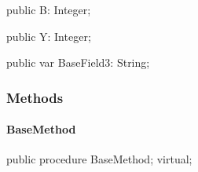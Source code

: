 \documentclass{report}
\newif\ifpdf
\begin{document}
\begin{list}{}
\par  \label{ok_inherited_members.TBase-B}
\item[\textbf{B}\hfill]
\ifpdf
\begin{flushleft}
\fi
\begin{ttfamily}
public B: Integer;\end{ttfamily}

\ifpdf
\end{flushleft}
\fi


\par  \label{ok_inherited_members.TBase-Y}
\item[\textbf{Y}\hfill]
\ifpdf
\begin{flushleft}
\fi
\begin{ttfamily}
public Y: Integer;\end{ttfamily}

\ifpdf
\end{flushleft}
\fi


\par  \label{ok_inherited_members.TBase-BaseField3}
\item[\textbf{BaseField3}\hfill]
\ifpdf
\begin{flushleft}
\fi
\begin{ttfamily}
public var BaseField3: String;\end{ttfamily}

\ifpdf
\end{flushleft}
\fi


\par  \end{list}
\subsubsection*{\large{\textbf{Methods}}\normalsize\hspace{1ex}\hfill}
\paragraph*{BaseMethod}\hspace*{\fill}

\label{ok_inherited_members.TBase-BaseMethod}
\begin{list}{}{
\setlength{\itemindent}{0cm}
\setlength{\listparindent}{0cm}
\setlength{\leftmargin}{\evensidemargin}
\addtolength{\leftmargin}{\tmplength}
\settowidth{\labelsep}{X}
\addtolength{\leftmargin}{\labelsep}
\setlength{\labelwidth}{\tmplength}
}
\item[\textbf{Declaration}\hfill]
\ifpdf
\begin{flushleft}
\fi
\begin{ttfamily}
public procedure BaseMethod; virtual;\end{ttfamily}

\ifpdf
\end{flushleft}
\fi

\end{list}
\end{document}
